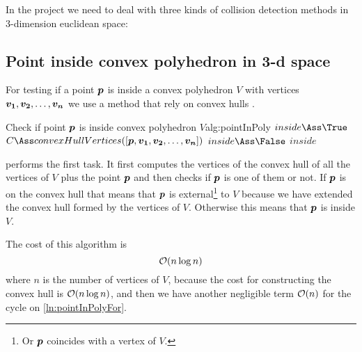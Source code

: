 \documentclass[dissertation.tex]{subfiles}
\begin{document}
In the project we need to deal with three kinds of collision detection
methods in 3-dimension euclidean space:

\subsection{Point inside convex polyhedron in 3-d space}
For testing if a point $\boldsymbol{p}$ is inside a convex polyhedron $V$ with
vertices $\boldsymbol{v_1},\boldsymbol{v_2},\dots,\boldsymbol{v_n}$ we use a method that rely
on convex hulls \cite{deberg}\cite{schneider}.

\begin{algo}{Check if point $\boldsymbol{p}$ is inside convex polyhedron $V$}{alg:pointInPoly}
  \State $inside\Ass\True$
  \State $C\Ass convexHullVertices([\ve{p},\ve{v_1},\ve{v_2},\dots,\ve{v_n}])$
  \label{ln:pointInPolyFor}
  \State $inside\Ass\False$
  \State \Break
  \EndIf
  \EndFor
  \State\Return $inside$
  \EndFunction
\end{algo}
 performs the first task. It first
computes the vertices of the convex hull of all
the vertices of $V$ plus the point $\boldsymbol{p}$ and then checks if
$\boldsymbol{p}$ is one 
of them or not. If $\boldsymbol{p}$ is on the convex hull that
means that $\boldsymbol{p}$ is external\footnote{Or $\boldsymbol{p}$ coincides with a
  vertex of $V$.} to $V$ because we have extended the convex hull
formed by the vertices of $V$. Otherwise this means that $\boldsymbol{p}$ is
inside $V$.

The cost of this algorithm is
\begin{equation*}
  \mathcal{O}(n\log n)
\end{equation*}
where $n$ is the number of vertices of $V$, because the cost for
constructing the convex hull is \cite{deberg} $\mathcal{O}(n\log n)$, and
then we have another negligible term $\mathcal{O}(n)$ for the cycle on \cref{ln:pointInPolyFor}.
\end{document}
